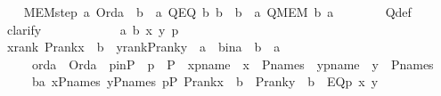 \begin{isabellebody}
\isanewline
\ \ \isamarkupfalse%
\ MEM{\isacharunderscore}{\kern0pt}step{\isacharcolon}{\kern0pt}\ {\isachardoublequoteopen}{\isasymAnd}a{\isachardot}{\kern0pt}\ Ord{\isacharparenleft}{\kern0pt}a{\isacharparenright}{\kern0pt}\ {\isasymLongrightarrow}\ {\isasymforall}b\ {\isasymin}\ a{\isachardot}{\kern0pt}\ Q{\isacharparenleft}{\kern0pt}EQ{\isacharcomma}{\kern0pt}\ b{\isacharcomma}{\kern0pt}\ b{\isacharparenright}{\kern0pt}\ {\isasymLongrightarrow}\ {\isasymforall}b\ {\isasymin}\ a{\isachardot}{\kern0pt}\ Q{\isacharparenleft}{\kern0pt}MEM{\isacharcomma}{\kern0pt}\ b{\isacharcomma}{\kern0pt}\ a{\isacharparenright}{\kern0pt}{\isachardoublequoteclose}\ \ \isanewline
\ \ \ \ \isamarkupfalse%
\ Q{\isacharunderscore}{\kern0pt}def\ \isanewline
\ \ \ \ \isamarkupfalse%
\ {\isacharparenleft}{\kern0pt}clarify{\isacharparenright}{\kern0pt}\ \isanewline
\ \ \isamarkupfalse%
\ {\isacharminus}{\kern0pt}\ \isanewline
\ \ \ \ \isamarkupfalse%
\ a\ b\ x\ y\ p\ \isanewline
\ \ \ \ \isamarkupfalse%
\ xrank{\isacharcolon}{\kern0pt}\ {\isachardoublequoteopen}P{\isacharunderscore}{\kern0pt}rank{\isacharparenleft}{\kern0pt}x{\isacharparenright}{\kern0pt}\ {\isasymle}\ b{\isachardoublequoteclose}\ \ yrank{\isacharcolon}{\kern0pt}{\isachardoublequoteopen}P{\isacharunderscore}{\kern0pt}rank{\isacharparenleft}{\kern0pt}y{\isacharparenright}{\kern0pt}\ {\isasymle}\ a{\isachardoublequoteclose}\ \ bina\ {\isacharcolon}{\kern0pt}\ {\isachardoublequoteopen}b\ {\isasymin}\ a{\isachardoublequoteclose}\ \isanewline
\ \ \ \ \ orda\ {\isacharcolon}{\kern0pt}\ {\isachardoublequoteopen}Ord{\isacharparenleft}{\kern0pt}a{\isacharparenright}{\kern0pt}{\isachardoublequoteclose}\ \ pinP\ {\isacharcolon}{\kern0pt}\ {\isachardoublequoteopen}p\ {\isasymin}\ P{\isachardoublequoteclose}\ \ xpname\ {\isacharcolon}{\kern0pt}\ {\isachardoublequoteopen}x\ {\isasymin}\ P{\isacharunderscore}{\kern0pt}names{\isachardoublequoteclose}\ \ ypname\ {\isacharcolon}{\kern0pt}\ {\isachardoublequoteopen}y\ {\isasymin}\ P{\isacharunderscore}{\kern0pt}names{\isachardoublequoteclose}\ \isanewline
\ \ \ \ \ {\isachardoublequoteopen}{\isasymforall}b{\isasymin}a{\isachardot}{\kern0pt}\ {\isasymforall}x{\isasymin}P{\isacharunderscore}{\kern0pt}names{\isachardot}{\kern0pt}\ {\isasymforall}y{\isasymin}P{\isacharunderscore}{\kern0pt}names{\isachardot}{\kern0pt}\ {\isasymforall}p{\isasymin}P{\isachardot}{\kern0pt}\ P{\isacharunderscore}{\kern0pt}rank{\isacharparenleft}{\kern0pt}x{\isacharparenright}{\kern0pt}\ {\isasymle}\ b\ {\isasymlongrightarrow}\ P{\isacharunderscore}{\kern0pt}rank{\isacharparenleft}{\kern0pt}y{\isacharparenright}{\kern0pt}\ {\isasymle}\ b\ {\isasymlongrightarrow}\ EQ{\isacharparenleft}{\kern0pt}p{\isacharcomma}{\kern0pt}\ x{\isacharcomma}{\kern0pt}\ y{\isacharparenright}{\kern0pt}\ {\isachardoublequoteclose}\isanewline

\end{isabellebody}
